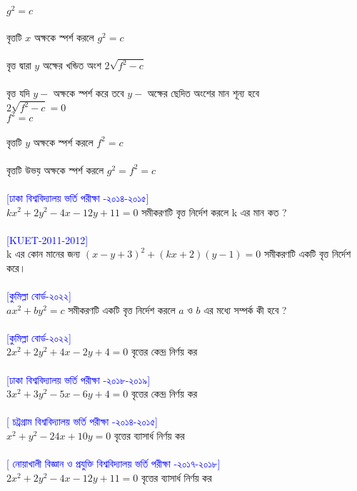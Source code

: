 \documentclass{article}
\begin{document}
 $g^2=c$\\
\\
বৃত্তটি  $x$ অক্ষকে স্পর্শ করলে  $g^2=c$\\
\\
বৃত্ত দ্বারা $y$ অক্ষের খন্ডিত অংশ	$2\sqrt{f^2-c}$\\
 \\
 বৃত্ত যদি $y-$ অক্ষকে স্পর্শ করে তবে $y-$ অক্ষের ছেদিত অংশের মান শূন্য হবে\\
   $2\sqrt{f^2-c}=0$\\
    $f^2=c$\\
 \\ 
বৃত্তটি  $y$ অক্ষকে স্পর্শ করলে  $f^2=c$\\
\\
বৃত্তটি উভয় অক্ষকে স্পর্শ করলে 	$g^2=f^2=c$\\ 
\\
\textcolor{blue}{[ঢাকা বিশ্ববিদ্যালয় ভর্তি পরীক্ষা -২০১৪-২০১৫]}\\
$kx^2+2y^2-4x-12y+11=0$ সমীকরণটি বৃত্ত নির্দেশ করলে k এর মান কত ? \\ 
\\
\textcolor{blue}{[KUET-2011-2012]}\\
k এর কোন মানের জন্য  $(x-y+3)^2+(kx+2)(y-1)=0$ সমীকরণটি একটি বৃত্ত নির্দেশ করে। \\ 
\\ 
\textcolor{blue}{[কুমিল্লা বোর্ড-২০২২]}\\
$ax^2+by^2=c$ সমীকরণটি একটি বৃত্ত নির্দেশ করলে $a$ ও $b$ এর মধ্যে সম্পর্ক কী হবে ?  \\
\\ 
\textcolor{blue}{[কুমিল্লা বোর্ড-২০২২]}\\
$2x^2+2y^2+4x-2y+4=0$ বৃত্তের কেন্দ্র নির্ণয় কর \\ 
\\
\textcolor{blue}{[ঢাকা বিশ্ববিদ্যালয় ভর্তি পরীক্ষা -২০১৮-২০১৯]}\\
$3x^2+3y^2-5x-6y+4=0$ বৃত্তের কেন্দ্র নির্ণয় কর \\ 
\\
\textcolor{blue}{[ চট্রগ্রাম বিশ্ববিদ্যালয় ভর্তি পরীক্ষা -২০১৪-২০১৫]}\\
$x^2+y^2-24x+10y=0$ বৃত্তের ব্যাসার্ধ নির্ণয় কর \\ 
\\
\textcolor{blue}{[ নোয়াখালী বিজ্ঞান ও প্রযুক্তি বিশ্ববিদ্যালয় ভর্তি পরীক্ষা -২০১৭-২০১৮]}\\
$2x^2+2y^2-4x-12y+11=0$ বৃত্তের ব্যাসার্ধ নির্ণয় কর \\ 
\\
\end{document}
